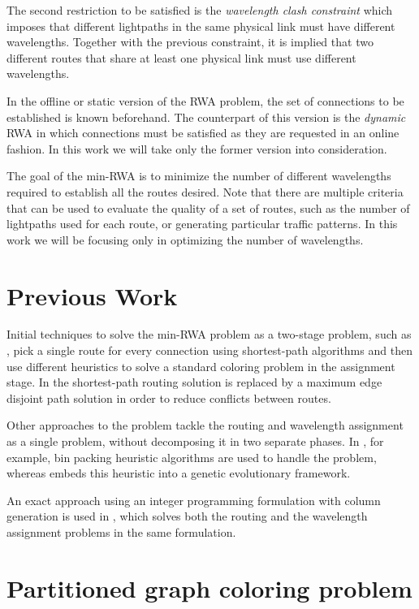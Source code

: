 The second restriction to be satisfied is the \textit{wavelength clash constraint} which imposes that different lightpaths in the same physical link must have different wavelengths. Together with the previous constraint, it is implied that two different routes that share at least one physical link must use different wavelengths.

In the offline or static version of the RWA problem, the set of connections to be established is known beforehand. The counterpart of this version is the \textit{dynamic} RWA in which connections must be satisfied as they are requested in an online fashion. In this work we will take only the former version into consideration.

The goal of the min-RWA is to minimize the number of different wavelengths required to establish all the routes desired. Note that there are multiple criteria that can be used to evaluate the quality of a set of routes, such as the number of lightpaths used for each route, or generating particular traffic patterns. In this work we will be focusing only in optimizing the number of wavelengths.

\section*{Previous Work}

Initial techniques to solve the min-RWA problem as a two-stage problem, such as \cite{hyytia14wavelength}, pick a single route for every connection using shortest-path algorithms and then use different heuristics to solve a standard coloring problem in the assignment stage. In \cite{manohar2002routing} the shortest-path routing solution is replaced by a maximum edge disjoint path solution in order to reduce conflicts between routes.

Other approaches to the problem tackle the routing and wavelength assignment as a single problem, without decomposing it in two separate phases. In \cite{skorin2007routing}, for example, bin packing heuristic algorithms are used to handle the problem, whereas \cite{noronha2007random} embeds this heuristic into a genetic evolutionary framework.

An exact approach using an integer programming formulation with column generation is used in \cite{lee2002optimization}, which solves both the routing and the wavelength assignment problems in the same formulation.

\section{Partitioned graph coloring problem}

